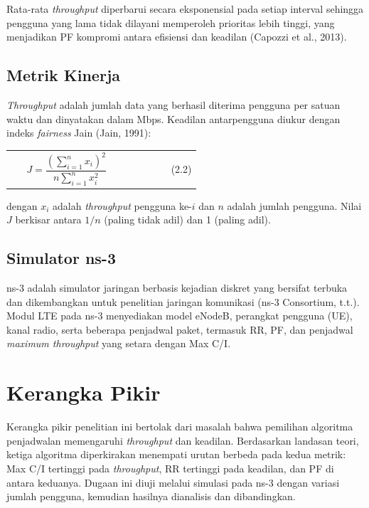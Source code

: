 Rata-rata \textit{throughput} diperbarui secara eksponensial pada setiap interval sehingga pengguna yang lama tidak dilayani memperoleh prioritas lebih tinggi, yang menjadikan PF kompromi antara efisiensi dan keadilan (Capozzi et al., 2013).

\subsection{Metrik Kinerja}
\textit{Throughput} adalah jumlah data yang berhasil diterima pengguna per satuan waktu dan dinyatakan dalam Mbps. Keadilan antarpengguna diukur dengan indeks \textit{fairness} Jain (Jain, 1991):

\begin{tanpagaris}
\begin{longtable}{@{}p{0.08\linewidth}p{0.76\linewidth}r@{}}
 & $J=\dfrac{\left(\sum_{i=1}^{n}x_{i}\right)^{2}}{n\sum_{i=1}^{n}x_{i}^{2}}$ & (2.2) \\
\end{longtable}
\end{tanpagaris}

dengan $x_{i}$ adalah \textit{throughput} pengguna ke-$i$ dan $n$ adalah jumlah pengguna. Nilai $J$ berkisar antara $1/n$ (paling tidak adil) dan 1 (paling adil).

\subsection{Simulator ns-3}
ns-3 adalah simulator jaringan berbasis kejadian diskret yang bersifat terbuka dan dikembangkan untuk penelitian jaringan komunikasi (ns-3 Consortium, t.t.). Modul LTE pada ns-3 menyediakan model eNodeB, perangkat pengguna (UE), kanal radio, serta beberapa penjadwal paket, termasuk RR, PF, dan penjadwal \textit{maximum throughput} yang setara dengan Max C/I.

\section{Kerangka Pikir}
Kerangka pikir penelitian ini bertolak dari masalah bahwa pemilihan algoritma penjadwalan memengaruhi \textit{throughput} dan keadilan. Berdasarkan landasan teori, ketiga algoritma diperkirakan menempati urutan berbeda pada kedua metrik: Max C/I tertinggi pada \textit{throughput}, RR tertinggi pada keadilan, dan PF di antara keduanya. Dugaan ini diuji melalui simulasi pada ns-3 dengan variasi jumlah pengguna, kemudian hasilnya dianalisis dan dibandingkan.
